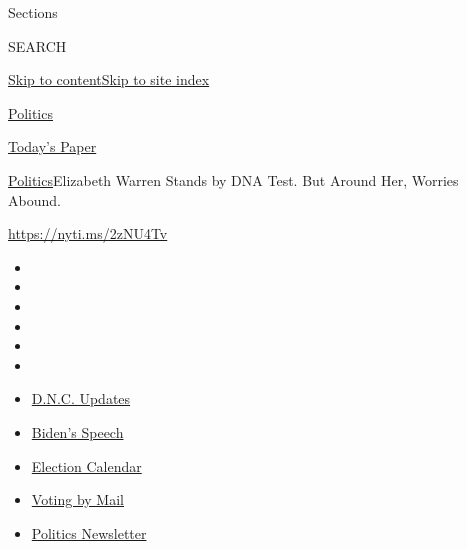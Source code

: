 Sections

SEARCH

\protect\hyperlink{site-content}{Skip to
content}\protect\hyperlink{site-index}{Skip to site index}

\href{https://www.nytimes3xbfgragh.onion/section/politics}{Politics}

\href{https://myaccount.nytimes3xbfgragh.onion/auth/login?response_type=cookie\&client_id=vi}{}

\href{https://www.nytimes3xbfgragh.onion/section/todayspaper}{Today's
Paper}

\href{/section/politics}{Politics}\textbar{}Elizabeth Warren Stands by
DNA Test. But Around Her, Worries Abound.

\url{https://nyti.ms/2zNU4Tv}

\begin{itemize}
\item
\item
\item
\item
\item
\item
\end{itemize}

\begin{itemize}
\item
  \href{https://www.nytimes3xbfgragh.onion/live/2020/08/20/us/dnc-convention-election?action=click\&pgtype=Article\&state=default\&region=TOP_BANNER\&context=storylines_menu}{D.N.C.
  Updates}
\item
  \href{https://www.nytimes3xbfgragh.onion/2020/08/20/us/politics/biden-presidential-nomination-dnc.html?action=click\&pgtype=Article\&state=default\&region=TOP_BANNER\&context=storylines_menu}{Biden's
  Speech}
\item
  \href{https://www.nytimes3xbfgragh.onion/interactive/2019/us/elections/2020-presidential-election-calendar.html?action=click\&pgtype=Article\&state=default\&region=TOP_BANNER\&context=storylines_menu}{Election
  Calendar}
\item
  \href{https://www.nytimes3xbfgragh.onion/interactive/2020/08/11/us/politics/vote-by-mail-us-states.html?action=click\&pgtype=Article\&state=default\&region=TOP_BANNER\&context=storylines_menu}{Voting
  by Mail}
\item
  \href{https://www.nytimes3xbfgragh.onion/newsletters/politics?action=click\&pgtype=Article\&state=default\&region=TOP_BANNER\&context=storylines_menu}{Politics
  Newsletter}
\end{itemize}

